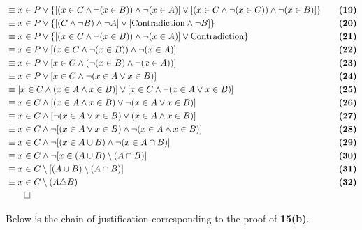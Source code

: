\begin{alignat*}{2}
&\equiv x \in P \vee \{[(x \in C \wedge \neg (x \in B)) \wedge \neg (x \in A)] \vee [(x \in C \wedge \neg (x \in C)) \wedge \neg (x \in B)]\} && \quad \textbf{(19)}\\
&\equiv x \in P \vee \{[(C \wedge \neg B) \wedge \neg A] \vee [\text{Contradiction} \wedge \neg B]\} && \quad \textbf{(20)}\\
&\equiv x \in P \vee \{[(x \in C \wedge \neg (x \in B)) \wedge \neg (x \in A)] \vee \text{Contradiction}\} && \quad \textbf{(21)}\\
&\equiv x \in P \vee [(x \in C \wedge \neg (x \in B)) \wedge \neg (x \in A)] && \quad \textbf{(22)}\\
&\equiv x \in P \vee [x \in C \wedge (\neg (x \in B) \wedge \neg (x \in A))] && \quad \textbf{(23)}\\
&\equiv x \in P \vee [x \in C \wedge \neg (x \in A \vee x \in B)] && \quad \textbf{(24)}\\
&\equiv [x \in C \wedge (x \in A \wedge x \in B)] \vee [x \in C \wedge \neg (x \in A \vee x \in B)] && \quad \textbf{(25)}\\
&\equiv x \in C \wedge [(x \in A \wedge x \in B) \vee \neg (x \in A \vee x \in B)] && \quad \textbf{(26)}\\
&\equiv x \in C \wedge [\neg (x \in A \vee x \in B) \vee (x \in A \wedge x \in B)] && \quad \textbf{(27)}\\
&\equiv x \in C \wedge \neg [(x \in A \vee x \in B) \wedge \neg (x \in A \wedge x \in B)] && \quad \textbf{(28)}\\
&\equiv x \in C \wedge \neg [(x \in A \cup B) \wedge \neg (x \in A \cap B)] && \quad \textbf{(29)}\\
&\equiv x \in C \wedge \neg [x \in (A \cup B) \setminus (A \cap B)] && \quad \textbf{(30)}\\
&\equiv x \in C \setminus [(A \cup B) \setminus (A \cap B)] && \quad \textbf{(31)}\\
&\equiv x \in C \setminus (A \triangle B) && \quad \textbf{(32)}\\
&\qed
\end{alignat*}
\pagebreak

Below is the chain of justification corresponding to the proof of \textbf{15(b)}.

